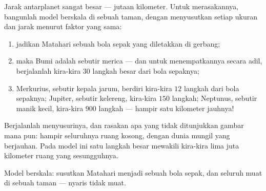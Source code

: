 \begin{method}\label{met:g4:solar-system:model}
Jarak antarplanet sangat besar --- jutaan kilometer. Untuk
merasakannya, bangunlah model berskala  di sebuah taman,
dengan menyusutkan setiap ukuran dan jarak menurut faktor yang sama:
\begin{enumerate}
  \item jadikan Matahari sebuah bola sepak yang diletakkan di gerbang;
  \item maka Bumi adalah sebutir merica --- dan untuk menempatkannya
        secara adil, berjalanlah kira-kira $30$ langkah besar dari
        bola sepaknya;
  \item Merkurius, sebutir kepala jarum, berdiri kira-kira $12$
        langkah dari bola sepaknya; Jupiter, sebutir kelereng,
        kira-kira $150$ langkah; Neptunus, sebutir manik kecil,
        kira-kira $900$ langkah --- hampir satu kilometer jauhnya!
\end{enumerate}
Berjalanlah menyusurinya, dan rasakan apa yang tidak ditunjukkan
gambar mana pun:  hampir seluruhnya ruang kosong, dengan
dunia mungil yang berjauhan. Pada model ini satu langkah besar
mewakili kira-kira lima juta kilometer ruang yang sesungguhnya.
\end{method}

\begin{omfigure}

{\small Model berskala: susutkan Matahari menjadi sebuah bola sepak,
dan seluruh  muat di sebuah taman --- nyaris tidak muat.}
\end{omfigure}

